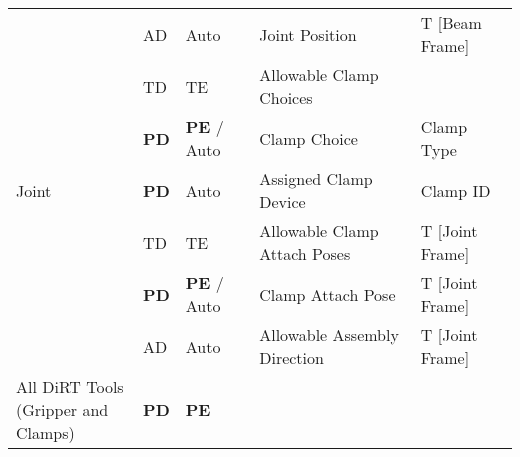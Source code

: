 \begin{table}[H]
\begin{adjustbox}{max width=\textwidth}
\begin{tabular}{p{2.09cm}p{1.51cm}p{1.93cm}p{5.92cm}p{4.48cm}}
\hline
\multicolumn{1}{|p{2.09cm}}{\multirow{7}{*}{\parbox{2.09cm}{{\footnotesize Joint}}}} & 
\multicolumn{1}{|p{1.51cm}}{{\footnotesize AD}} & 
\multicolumn{1}{|p{1.93cm}}{{\footnotesize Auto}} & 
\multicolumn{1}{|p{5.92cm}}{{\footnotesize Joint Position}} & 
\multicolumn{1}{|p{4.48cm}|}{{\footnotesize T [Beam Frame]}} \\ 
\hhline{~----}
\multicolumn{1}{|p{2.09cm}}{} & 
\multicolumn{1}{|p{1.51cm}}{{\footnotesize TD}} & 
\multicolumn{1}{|p{1.93cm}}{{\footnotesize TE}} & 
\multicolumn{1}{|p{5.92cm}}{{\footnotesize Allowable Clamp Choices}} & 
\multicolumn{1}{|p{4.48cm}|}{} \\ 
\hhline{~----}
\multicolumn{1}{|p{2.09cm}}{} & 
\multicolumn{1}{|p{1.51cm}}{{\footnotesize \textbf{PD}}} & 
\multicolumn{1}{|p{1.93cm}}{{\footnotesize \textbf{PE }/ Auto}} & 
\multicolumn{1}{|p{5.92cm}}{{\footnotesize Clamp Choice}} & 
\multicolumn{1}{|p{4.48cm}|}{{\footnotesize Clamp Type}} \\ 
\hhline{~----}
\multicolumn{1}{|p{2.09cm}}{} & 
\multicolumn{1}{|p{1.51cm}}{{\footnotesize \textbf{PD}}} & 
\multicolumn{1}{|p{1.93cm}}{{\footnotesize Auto}} & 
\multicolumn{1}{|p{5.92cm}}{{\footnotesize Assigned Clamp Device}} & 
\multicolumn{1}{|p{4.48cm}|}{{\footnotesize Clamp ID}} \\ 
\hhline{~----}
\multicolumn{1}{|p{2.09cm}}{} & 
\multicolumn{1}{|p{1.51cm}}{{\footnotesize TD}} & 
\multicolumn{1}{|p{1.93cm}}{{\footnotesize TE}} & 
\multicolumn{1}{|p{5.92cm}}{{\footnotesize Allowable Clamp Attach Poses}} & 
\multicolumn{1}{|p{4.48cm}|}{{\footnotesize T [Joint Frame]}} \\ 
\hhline{~----}
\multicolumn{1}{|p{2.09cm}}{} & 
\multicolumn{1}{|p{1.51cm}}{{\footnotesize \textbf{PD}}} & 
\multicolumn{1}{|p{1.93cm}}{{\footnotesize \textbf{PE }/ Auto}} & 
\multicolumn{1}{|p{5.92cm}}{{\footnotesize Clamp Attach Pose}} & 
\multicolumn{1}{|p{4.48cm}|}{{\footnotesize T [Joint Frame]}} \\ 
\hhline{~----}
\multicolumn{1}{|p{2.09cm}}{} & 
\multicolumn{1}{|p{1.51cm}}{{\footnotesize AD}} & 
\multicolumn{1}{|p{1.93cm}}{{\footnotesize Auto}} & 
\multicolumn{1}{|p{5.92cm}}{{\footnotesize Allowable Assembly Direction}} & 
\multicolumn{1}{|p{4.48cm}|}{{\footnotesize T [Joint Frame]}} \\ 
\hline
\multicolumn{1}{|p{2.09cm}}{\multirow{3}{*}{\parbox{2.09cm}{{\footnotesize All DiRT Tools \\ (Gripper and Clamps)}}}} & 
\multicolumn{1}{|p{1.51cm}}{{\footnotesize \textbf{PD}}} & 
\multicolumn{1}{|p{1.93cm}}{{\footnotesize \textbf{PE}}} & 

\end{tabular}
\end{adjustbox}
\end{table}
